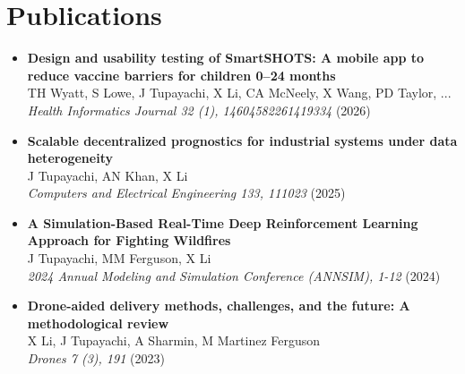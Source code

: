 \documentclass[10pt, letterpaper]{article}
\begin{document}
    \section*{Publications}
\small
    \begin{itemize}[left=0pt] %

        \item \textbf{Design and usability testing of SmartSHOTS: A mobile app to reduce vaccine barriers for children 0–24 months} \\
        TH Wyatt, S Lowe, J Tupayachi, X Li, CA McNeely, X Wang, PD Taylor, ... \\
        \textit{Health Informatics Journal 32 (1), 14604582261419334} (2026) \\

        \item \textbf{Scalable decentralized prognostics for industrial systems under data heterogeneity} \\
        J Tupayachi, AN Khan, X Li \\
        \textit{Computers and Electrical Engineering 133, 111023} (2025) \\



        \item \textbf{A Simulation-Based Real-Time Deep Reinforcement Learning Approach for Fighting Wildfires} \\
        J Tupayachi, MM Ferguson, X Li \\
        \textit{2024 Annual Modeling and Simulation Conference (ANNSIM), 1-12} (2024) \\

        \item \textbf{Drone-aided delivery methods, challenges, and the future: A methodological review} \\
        X Li, J Tupayachi, A Sharmin, M Martinez Ferguson \\
        \textit{Drones 7 (3), 191} (2023) \\
    

\end{itemize}
\end{document}

